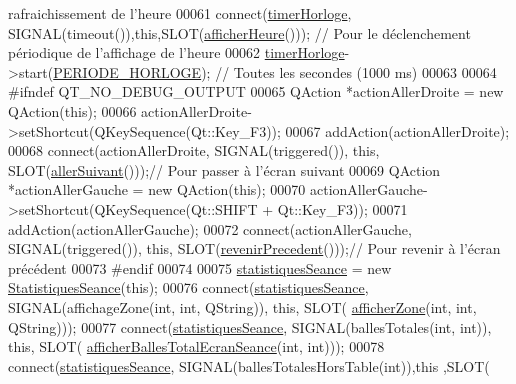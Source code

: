 \begin{DoxyCode}
{       rafraichissement de l'heure}
00061     connect(\hyperlink{class_ttpa_ihm_a447ad7262efa01d22bc3222e0e470087}{timerHorloge}, SIGNAL(timeout()),\textcolor{keyword}{this},SLOT(\hyperlink{class_ttpa_ihm_ad1fc60bf431308d8e52cbc5e35d0d3de}{afficherHeure}())); \textcolor{comment}{// Pour
       le déclenchement périodique de l'affichage de l'heure    }
00062     \hyperlink{class_ttpa_ihm_a447ad7262efa01d22bc3222e0e470087}{timerHorloge}->start(\hyperlink{ttpaihm_8h_abe1de80d8a7149cf82da305f032d7b1e}{PERIODE\_HORLOGE}); \textcolor{comment}{// Toutes les secondes (1000 ms)}
00063 
00064 \textcolor{preprocessor}{#ifndef QT\_NO\_DEBUG\_OUTPUT}
00065     QAction *actionAllerDroite = \textcolor{keyword}{new} QAction(\textcolor{keyword}{this});
00066     actionAllerDroite->setShortcut(QKeySequence(Qt::Key\_F3));
00067     addAction(actionAllerDroite);
00068     connect(actionAllerDroite, SIGNAL(triggered()), \textcolor{keyword}{this}, SLOT(\hyperlink{class_ttpa_ihm_a647bfb1ce10f8ac4b1294a880a76f3d2}{allerSuivant}()));\textcolor{comment}{// Pour passer
       à l'écran suivant}
00069     QAction *actionAllerGauche = \textcolor{keyword}{new} QAction(\textcolor{keyword}{this});
00070     actionAllerGauche->setShortcut(QKeySequence(Qt::SHIFT + Qt::Key\_F3));
00071     addAction(actionAllerGauche);
00072     connect(actionAllerGauche, SIGNAL(triggered()), \textcolor{keyword}{this}, SLOT(\hyperlink{class_ttpa_ihm_a92bcffa9388cff7b55a52ae36e5d120d}{revenirPrecedent}()));\textcolor{comment}{// Pour
       revenir à l'écran précédent}
00073 \textcolor{preprocessor}{#endif}
00074 
00075     \hyperlink{class_ttpa_ihm_abed6897d6f7b4d3a5eb8dcc07651e740}{statistiquesSeance} = \textcolor{keyword}{new} \hyperlink{class_statistiques_seance}{StatistiquesSeance}(\textcolor{keyword}{this});
00076     connect(\hyperlink{class_ttpa_ihm_abed6897d6f7b4d3a5eb8dcc07651e740}{statistiquesSeance}, SIGNAL(affichageZone(\textcolor{keywordtype}{int}, \textcolor{keywordtype}{int}, QString)), \textcolor{keyword}{this}, SLOT(
      \hyperlink{class_ttpa_ihm_a3b00f90707811240c7dcfe8ed3dce783}{afficherZone}(\textcolor{keywordtype}{int}, \textcolor{keywordtype}{int}, QString)));
00077     connect(\hyperlink{class_ttpa_ihm_abed6897d6f7b4d3a5eb8dcc07651e740}{statistiquesSeance}, SIGNAL(ballesTotales(\textcolor{keywordtype}{int}, \textcolor{keywordtype}{int})), \textcolor{keyword}{this}, SLOT(
      \hyperlink{class_ttpa_ihm_a7b8784d0550cf910b89006365bc8383a}{afficherBallesTotalEcranSeance}(\textcolor{keywordtype}{int}, \textcolor{keywordtype}{int})));
00078     connect(\hyperlink{class_ttpa_ihm_abed6897d6f7b4d3a5eb8dcc07651e740}{statistiquesSeance}, SIGNAL(ballesTotalesHorsTable(\textcolor{keywordtype}{int})),\textcolor{keyword}{this} ,SLOT(

\end{DoxyCode}
